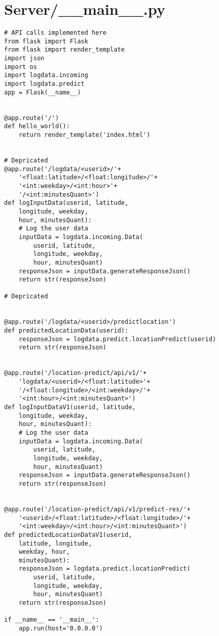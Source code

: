 \documentclass[conference]{IEEEtran}
\begin{document}

\section{Server/\_\_main\_\_.py}
\begin{lstlisting}
# API calls implemented here
from flask import Flask
from flask import render_template
import json
import os
import logdata.incoming
import logdata.predict
app = Flask(__name__)


@app.route('/')
def hello_world():
    return render_template('index.html')


# Depricated
@app.route('/logdata/<userid>/'+
    '<float:latitude>/<float:longitude>/'+
    '<int:weekday>/<int:hour>'+
    '/<int:minutesQuant>')
def logInputData(userid, latitude, 
    longitude, weekday, 
    hour, minutesQuant):
    # Log the user data
    inputData = logdata.incoming.Data(
        userid, latitude, 
        longitude, weekday, 
        hour, minutesQuant)
    responseJson = inputData.generateResponseJson()
    return str(responseJson)

# Depricated


@app.route('/logdata/<userid>/predictlocation')
def predictedLocationData(userid):
    responseJson = logdata.predict.locationPredict(userid)
    return str(responseJson)


@app.route('/location-predict/api/v1/'+
    'logdata/<userid>/<float:latitude>'+
    '/<float:longitude>/<int:weekday>/'+
    '<int:hour>/<int:minutesQuant>')
def logInputDataV1(userid, latitude, 
    longitude, weekday, 
    hour, minutesQuant):
    # Log the user data
    inputData = logdata.incoming.Data(
        userid, latitude, 
        longitude, weekday, 
        hour, minutesQuant)
    responseJson = inputData.generateResponseJson()
    return str(responseJson)


@app.route('/location-predict/api/v1/predict-res/'+
    '<userid>/<float:latitude>/<float:longitude>/'+
    '<int:weekday>/<int:hour>/<int:minutesQuant>')
def predictedLocationDataV1(userid, 
    latitude, longitude, 
    weekday, hour, 
    minutesQuant):
    responseJson = logdata.predict.locationPredict(
        userid, latitude, 
        longitude, weekday, 
        hour, minutesQuant)
    return str(responseJson)

if __name__ == '__main__':
    app.run(host='0.0.0.0')

\end{lstlisting}
\end{document}
